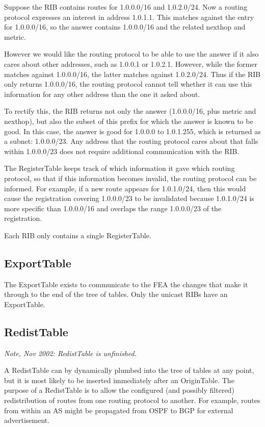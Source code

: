 \documentclass[11pt]{article}
\begin{document}
Suppose the RIB contains routes for 1.0.0.0/16 and 1.0.2.0/24.  Now a
routing protocol expresses an interest in address 1.0.1.1.  This
matches against the entry for 1.0.0.0/16, so the answer contains
1.0.0.0/16 and the related nexthop and metric.

However we would like the routing protocol to be able to use the
answer if it also cares about other addresses, such as 1.0.0.1 or
1.0.2.1.  However, while the former matches against 1.0.0.0/16, the
latter matches against 1.0.2.0/24.  Thus if the RIB only returns
1.0.0.0/16, the routing protocol cannot tell whether it can use this
information for any other address than the one it asked about.

To rectify this, the RIB returns not only the answer (1.0.0.0/16, plus
metric and nexthop), but also the subset of this prefix for which the
answer is known to be good.  In this case, the answer is good for
1.0.0.0 to 1.0.1.255, which is returned as a subnet: 1.0.0.0/23.
Any address that the routing protocol cares about that falls within
1.0.0.0/23 does not require additional communication with the RIB.

The RegisterTable keeps track of which information it gave which
routing protocol, so that if this information becomes invalid, the
routing protocol can be informed.  For example, if a new route appears
for 1.0.1.0/24, then this would cause the registration covering
1.0.0.0/23 to be invalidated because 1.0.1.0/24 is more specific than
1.0.0.0/16 and overlaps the range 1.0.0.0/23 of the registration.

Each RIB only contains a single RegisterTable.

\subsection{ExportTable}

The ExportTable exists to communicate to the FEA the changes
that make it through to the end of the tree of tables.  Only the
unicast RIBs have an ExportTable.

\subsection{RedistTable}

{\it Note, Nov 2002: RedistTable is unfinished.}

A RedistTable can by dynamically plumbed into the tree of tables at
any point, but it is most likely to be inserted immediately after an
OriginTable.  The purpose of a RedistTable is to allow the configured
(and possibly filtered) redistribution of routes from one routing
protocol to another.  For example, routes from within an AS might be
propagated from OSPF to BGP for external advertisement.
\end{document}
